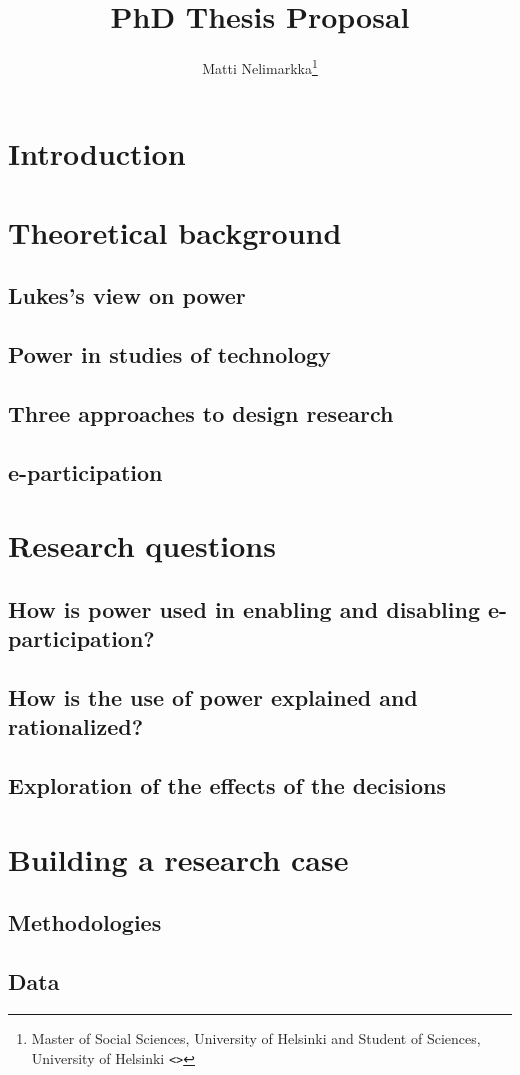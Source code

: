 \documentclass[12pt,a4paper]{article}
\author{Matti Nelimarkka\footnote{Master of Social Sciences, University of Helsinki and Student of Sciences, University of Helsinki \texttt{<\email{matti.nelimarkka@hiit.fi}>}}}
\title{PhD Thesis Proposal}
\begin{document}
\maketitle

\tableofcontents

\newpage

\section{Introduction}

\section{Theoretical background}

\subsection{Lukes's view on power}

\subsection{Power in studies of technology}

\subsection{Three approaches to design research}

\subsection{e-participation}

\section{Research questions}

\subsection{How is power used in enabling and disabling e-participation?}

\subsection{How is the use of power explained and rationalized?}

\subsection{Exploration of the effects of the decisions}

\section{Building a research case}

\subsection{Methodologies}

\subsection{Data}
\end{document}
